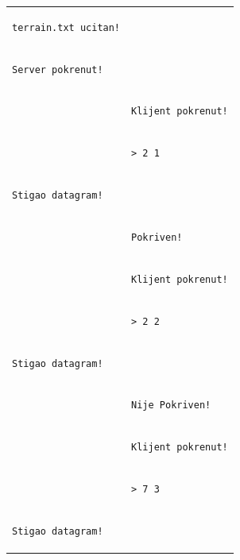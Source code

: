 \documentclass[]{article}
\begin{document}
\begin{enumerate}
\vspace{10pt}
\noindent
\begin{tabular}{ll}
\begin{lstlisting}
terrain.txt ucitan!
\end{lstlisting}& \\
\begin{lstlisting}
Server pokrenut!
\end{lstlisting}& \\
&\begin{lstlisting}
Klijent pokrenut!
\end{lstlisting}\\
&\begin{lstlisting}
> 2 1
\end{lstlisting}\\
\begin{lstlisting}
Stigao datagram!
\end{lstlisting}& \\
\begin{lstlisting}
\end{lstlisting}&\begin{lstlisting}
Pokriven!
\end{lstlisting}\\
&\begin{lstlisting}
Klijent pokrenut!
\end{lstlisting}\\
&\begin{lstlisting}
> 2 2
\end{lstlisting}\\
\begin{lstlisting}
Stigao datagram!
\end{lstlisting}& \\
\begin{lstlisting}
\end{lstlisting}&\begin{lstlisting}
Nije Pokriven!
\end{lstlisting}\\
&\begin{lstlisting}
Klijent pokrenut!
\end{lstlisting}\\
&\begin{lstlisting}
> 7 3
\end{lstlisting}\\
\begin{lstlisting}
Stigao datagram!
\end{lstlisting}& \\

\end{tabular}
\end{enumerate}
\end{document}
